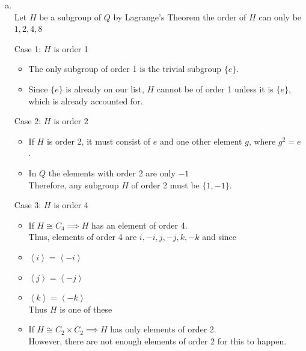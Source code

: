 \documentclass[12pt, letterpaper]{article}
\theoremstyle{definition}
\newcommand{\ang}[1]{\left\langle #1 \right\rangle}
\begin{document}
\begin{enumerate}[(a)]
\begin{enumerate}[1.]
        Consider $y^ax^b$\\
        $\varphi(y^ax^b)=\varphi(y^a)\varphi(x^b)=\varphi(y)^a\varphi(x)^b=j^ai^b$\\
        Thus $\varphi$ is an isomorphism thus $G \cong Q$
    \end{enumerate}
    \item {}
      \phantom{text}\\
Let $H$ be a subgroup of $Q$ by Lagrange's Theorem the order of $H$ can only be $1,2,4,8$

Case 1: \(H\) is order 1
\begin{itemize}
    \item The only subgroup of order 1 is the trivial subgroup \( \{e\} \).
    \item Since \( \{e\} \) is already on our list, \( H \) cannot be of order 1 unless it is \( \{e\} \), which is already accounted for.
\end{itemize}

Case 2: \(H\) is order 2
\begin{itemize}
    \item If $H$ is order 2, it must consist of $e$ and one other element $g$, where $g^2=e$.
    \item In $Q$ the elements with order 2 are only $-1$\\
    Therefore, any subgroup \( H \) of order 2 must be $\{1,-1\}$.
\end{itemize}

Case 3: \(H\) is order 4
\begin{itemize}
    \item If $H \cong C_4 \implies H$ has an element of order 4.\\
    Thus, elements of order 4 are $i,-i,j,-j,k,-k$ and since
    \item $\ang{i}=\ang{-i}$
    \item $\ang{j}=\ang{-j}$
    \item $\ang{k}=\ang{-k}$\\
    Thus $H$ is one of these
    \item If $H \cong C_2\times C_2 \implies H$ has only elements of order 2.\\
    However, there are not enough elements of order 2 for this to happen.
\end{itemize}


\end{enumerate}
\end{document}
